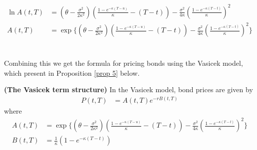 \begin{appendices}
\begin{align}
     \ln A(t, T) &= \left(\theta -\frac{\sigma^2}{2\kappa^2}\right) \left(\frac{1-e^{-\kappa(T-u)}}{\kappa}-(T-t)\right)
     -\frac{\sigma^2}{4 \kappa}\left(\frac{1-e^{-\kappa(T-t)}}{\kappa}\right)^2 \nonumber\\
     A(t,T)&= \exp \Biggl\{\left(\theta-\frac{\sigma^2}{2 \kappa^2}\right)\left(\frac{1-e^{-\kappa(T-u)}}{\kappa}-(T-t)\right)
     -\frac{\sigma^2}{4 \kappa}\left(\frac{1-e^{-\kappa(T-t)}}{\kappa}\right)^2 \Biggr\} 
 \end{align}
 \\\\
  Combining this we get the formula for pricing bonds using the Vasicek model, which present 
  in Proposition \autoref{prop 5} below. 
 
 \begin{proposition}
     \label{prop 5}
     \textbf{(The Vasicek term structure)} In the Vasicek model, bond prices are given by
  \begin{align}
     P(t,T) &= A(t,T) e^{-rB(t,T)} 
 \end{align}
 where
 \begin{align*}
     A(t,T)&= \exp \Biggl\{\left(\theta-\frac{\sigma^2}{2 \kappa^2}\right)\left(\frac{1-e^{-\kappa(T-u)}}{\kappa}-(T-t)\right)
     -\frac{\sigma^2}{4 \kappa}\left(\frac{1-e^{-\kappa(T-t)}}{\kappa}\right)^2 \Biggr\} \\
     B(t,T) & =\frac{1}{\kappa} \left( 1 - e^{-\kappa (T-t)} \right)  
 \end{align*}
 \cite{Bjork}
 \end{proposition}
 \noindent
\end{appendices}
    